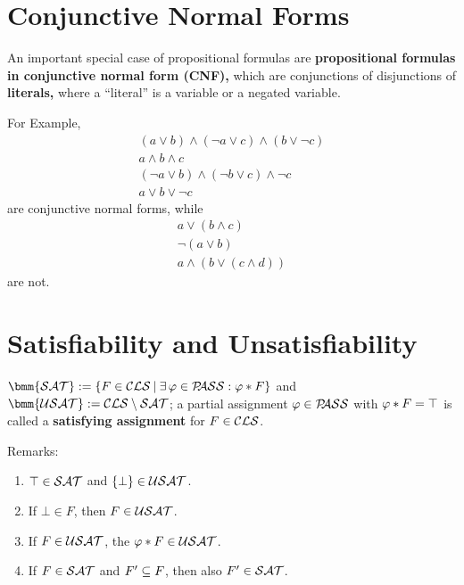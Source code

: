 \documentclass[12pt]{book}
\begin{document}
\section{Conjunctive Normal Forms}
\label{sec:Conjunctive Normal Forms}

\begin{defi}\label{def:CNF}
  An important special case of propositional formulas are \textbf{propositional formulas in conjunctive normal form (CNF),} which are
conjunctions of disjunctions of \textbf{literals,}  where a ``literal'' is a variable or a negated variable.  
\end{defi}

\begin{examp}\label{exp:cnf}
For Example, \begin{eqnarray*}
&(a\vee b) \wedge (\neg a \vee c) \wedge (b\vee \neg c)& \\
&a\wedge b \wedge c& \\
&(\neg a \vee b) \wedge (\neg b \vee c) \wedge \neg c& \\
&a \vee b \vee \neg c&
\end{eqnarray*} are conjunctive normal forms, while
\begin{eqnarray*}
&a\vee (b \wedge c)&\\
&\neg(a\vee b)& \\
&a \wedge (b\vee (c\wedge d))&
\end{eqnarray*}
are not. 
\end{examp}

\section{Satisfiability and Unsatisfiability}
\label{sec:Satisfiability and Unsatisfiability}

\begin{defi}\label{def:sat}
  $\bmm{\Sat} := \set{F \in \Cls \mb \ex\, \vp \in \Pass : \vp * F}$ and $\bmm{\Usat} := \Cls \sm \Sat$; a partial assignment $\varphi \in \mathcal{P\hspace{-0.32em}ASS}$ with $\varphi * F = \top$ is called a \textbf{satisfying assignment} for $F \in \mathcal{CLS}$.
\end{defi}
Remarks:
\begin{enumerate}
\item $\top \in \mathcal{SAT}$ and $\{ \bot \} \in \mathcal{USAT}$.
\item If $\bot \in F$, then $F \in \mathcal{USAT}$.
\item If $F \in \mathcal{USAT}$, the $\varphi * F \in \mathcal{USAT}$.
\item If $F \in \mathcal{SAT}$ and $F' \subseteq F$, then also $F' \in \mathcal{SAT}$.
\end{enumerate}
\end{document}
